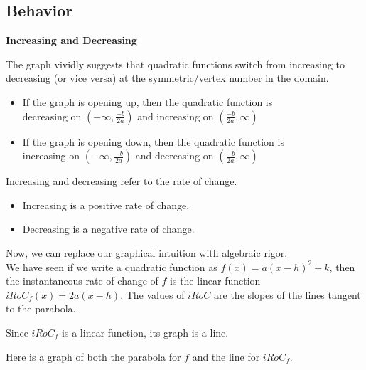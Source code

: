 \documentclass{ximera}
\begin{document}
\subsection*{Behavior}



\textbf{\textcolor{blue!55!black}{Increasing and Decreasing}}






The graph vividly suggests that quadratic functions switch from increasing to decreasing (or vice versa) at the symmetric/vertex number in the domain.


\begin{itemize}
\item If the graph is opening up, then the quadratic function is \\

decreasing on $\left( -\infty, \frac{-b}{2a} \right)$ and increasing on $\left( \frac{-b}{2a}, \infty \right)$

\item If the graph is opening down, then the quadratic function is \\

increasing on $\left( -\infty, \frac{-b}{2a} \right)$ and decreasing on $\left( \frac{-b}{2a}, \infty \right)$
\end{itemize}





Increasing and decreasing refer to the rate of change.


\begin{itemize}
\item Increasing is a positive rate of change.
\item Decreasing is a negative rate of change.
\end{itemize}



Now, we can replace our graphical intuition with algebraic rigor. \\ 

We have seen if we write a quadratic function as $f(x) = a (x - h)^2 + k$, then the instantaneous rate of change of $f$ is the linear function $iRoC_f(x) = 2 a (x - h)$. The values of $iRoC$ are the slopes of the lines tangent to the parabola.


Since $iRoC_f$ is a linear function, its graph is a line.


Here is a graph of both the parabola for $f$ and the line for $iRoC_f$.
\end{document}
